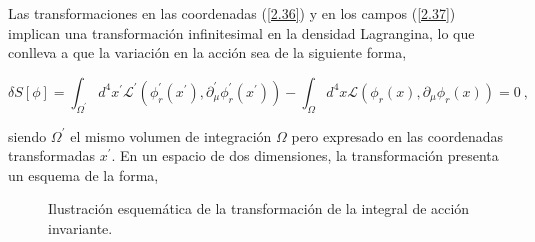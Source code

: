 Las transformaciones en las coordenadas (\ref{2.36}) y en los campos (\ref{2.37}) implican una transformación infinitesimal en la densidad Lagrangina, lo que conlleva a que la variación en la acción sea de la siguiente forma,

\begin{equation*}
\delta S[\phi]=\int_{\Omega ^{\prime }}d^{4}x^{\prime } \mathcal{L}^{\prime} \left(\phi_{r}^{\prime }\left( x^{\prime}\right) ,\partial^{\prime}_{\mu }\phi _{r}^{\prime }\left( x^{\prime}\right)\right)-\int_{\Omega }d^{4}x \mathcal{L}\left(\phi_{r}\left(x\right) ,\partial _{\mu }\phi_{r}\left( x\right)\right) =0~,
\end{equation*}

\noindent
siendo $\Omega^{\prime}$ el mismo volumen de integración $\Omega$ pero expresado en las coordenadas transformadas $x^{\prime}$. En un espacio de dos dimensiones, la transformación presenta un esquema de la forma,
\begin{figure}[H]
    \centering
    \caption{Ilustración esquemática de la transformación de la integral de acción invariante.}
    \label{Transformaciones}
\end{figure}
    


